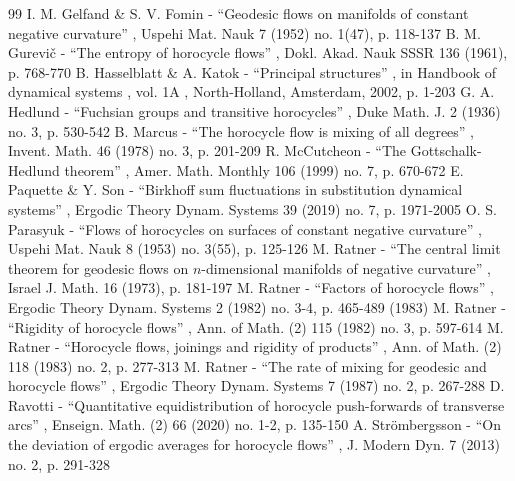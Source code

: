 \documentclass[11pt]{article}
\theoremstyle{definition}
\begin{document}
\begin{thebibliography}{99}
 I. M. Gelfand \& S. V. Fomin - “Geodesic flows on manifolds of constant negative curvature” , Uspehi Mat. Nauk 7 (1952) no. 1(47), p. 118-137
 B. M. Gurevič - “The entropy of horocycle flows” , Dokl. Akad. Nauk SSSR 136 (1961), p. 768-770
 B. Hasselblatt \& A. Katok - “Principal structures” , in Handbook of dynamical systems , vol. 1A , North-Holland, Amsterdam, 2002, p. 1-203
 G. A. Hedlund - “Fuchsian groups and transitive horocycles” , Duke Math. J. 2 (1936) no. 3, p. 530-542
 B. Marcus - “The horocycle flow is mixing of all degrees” , Invent. Math. 46 (1978) no. 3, p. 201-209
 R. McCutcheon - “The Gottschalk-Hedlund theorem” , Amer. Math. Monthly 106 (1999) no. 7, p. 670-672
 E. Paquette \& Y. Son - “Birkhoff sum fluctuations in substitution dynamical systems” , Ergodic Theory Dynam. Systems 39 (2019) no. 7, p. 1971-2005
 O. S. Parasyuk - “Flows of horocycles on surfaces of constant negative curvature” , Uspehi Mat. Nauk 8 (1953) no. 3(55), p. 125-126
 M. Ratner - “The central limit theorem for geodesic flows on $n$-dimensional manifolds of negative curvature” , Israel J. Math. 16 (1973), p. 181-197
 M. Ratner - “Factors of horocycle flows” , Ergodic Theory Dynam. Systems 2 (1982) no. 3-4, p. 465-489 (1983)
 M. Ratner - “Rigidity of horocycle flows” , Ann. of Math. (2) 115 (1982) no. 3, p. 597-614
 M. Ratner - “Horocycle flows, joinings and rigidity of products” , Ann. of Math. (2) 118 (1983) no. 2, p. 277-313
 M. Ratner - “The rate of mixing for geodesic and horocycle flows” , Ergodic Theory Dynam. Systems 7 (1987) no. 2, p. 267-288
 D. Ravotti - “Quantitative equidistribution of horocycle push-forwards of transverse arcs” , Enseign. Math. (2) 66 (2020) no. 1-2, p. 135-150
 A. Strömbergsson - “On the deviation of ergodic averages for horocycle flows” , J. Modern Dyn. 7 (2013) no. 2, p. 291-328
\end{thebibliography}
\end{document}
